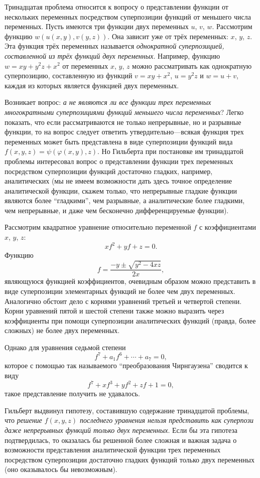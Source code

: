 \documentclass[twocolumn,10pt]{article}
\begin{document}
Тринадцатая проблема относится к вопросу о представлении функции от нескольких переменных посредством суперпозиции функций от меньшего числа переменных. Пусть имеются три функции двух переменных $u$, $v$, $w$. Рассмотрим функцию $w(u(x,y), v(y,z))$. Она зависит уже от трёх переменных: $x$, $y$, $z$. Эта функция трёх переменных называется \emph{однократной суперпозицией, составленной из трёх функций двух переменных}. Например, функцию $w=xy+y^2z+x^2$ от переменных $x$, $y$, $z$ можно рассматривать как однократную суперпозицию, составленную из функций $v=xy+x^2$, $u=y^2z$ и $w=u+v$, каждая из которых является функцией двух переменных.

Возникает вопрос: \emph{а не являются ли все функции трех переменных многократными суперпозициями функций меньшего числа переменных}? Легко показать, что если рассматриваются не только непрерывные, но и разрывные функции, то на вопрос следует ответить утвердительно---всякая функция трех переменных может быть представлена в виде суперпозиции функций вида $f(x,y,z)=\psi(\varphi(x,y),z)$. Но Гильберта при постановке им тринадцатой проблемы интересовал вопрос о представлении функции трех переменных посредством суперпозиции функций достаточно гладких, например, аналитических (мы не имеем возможности дать здесь точное определение аналитической функции, скажем только, что непрерывные гладкие функции являются более ``гладкими'', чем разрывные, а аналитические более гладкими, чем непрерывные, и даже чем бесконечно дифференцируемые функции).

Рассмотрим квадратное уравнение относительно переменной $f$ с коэффициентами $x$, $y$, $z$:
$$
  xf^2+yf+z=0.
$$
Функцию
$$
  f=\frac{-y\pm\sqrt{y^2-4xz}}{2x},
$$
являющуюся функцией коэффициентов, очевидным образом можно представить  в виде суперпозиции элементарных функций не более чем двух переменных. Аналогично обстоит дело с корнями уравнений третьей и четвертой степени. Корни уравнений пятой и шестой степени также можно выразить через коэффициенты при помощи суперпозиции аналитических функций (правда, более сложных) не более двух переменных.

Однако для уравнения седьмой степени
$$
f^7+a_1f^6+\cdots+a_7=0,
$$
которое с помощью так называемого ``преобразования Чирнгаузена'' сводится к виду
$$
  f^7+xf^3+yf^2+zf+1=0,
$$
такое представление получить не удавалось.

Гильберт выдвинул гипотезу, составившую содержание тринадцатой проблемы, что \emph{решение $f(x, y, z)$ последнего уравнения нельзя представить как суперпози даже непрерывных функций только двух переменных}. Если бы эта гипотеза подтвердилась, то оказалась бы решенной более сложная и важная задача о возможности представления аналитической функции трех переменных посредством суперпозиции достаточно гладких функций только двух переменных (оно оказывалось бы невозможным).
  
\end{document}
